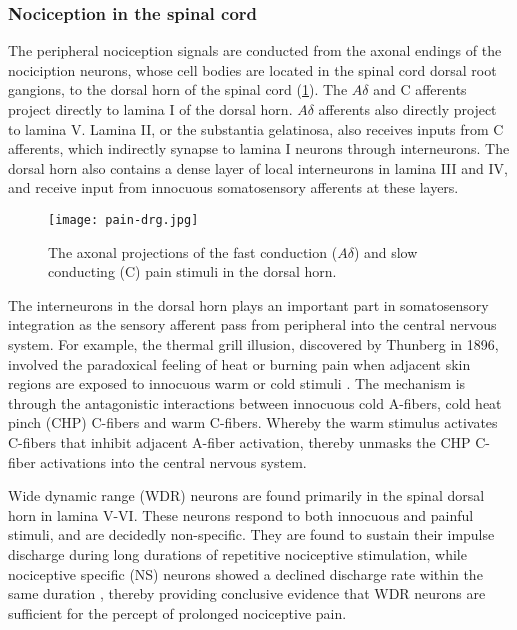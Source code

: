 \subsubsection{Nociception in the spinal cord}

The peripheral nociception signals are conducted from the axonal endings of the nociciption neurons, whose cell bodies are located in the spinal cord dorsal root gangions, to the dorsal horn of the spinal cord (\ref{fig:drg}). The $A\delta$ and C afferents project directly to lamina I of the dorsal horn. $A\delta$ afferents also directly project to lamina V. Lamina II, or the substantia gelatinosa, also receives inputs from C afferents, which indirectly synapse to lamina I neurons through interneurons. The dorsal horn also contains a dense layer of local interneurons in lamina III and IV, and receive input from innocuous somatosensory afferents at these layers. 

\begin{figure}[ht]
\texttt{[image: pain-drg.jpg]}
\centering
\caption{The axonal projections of the fast conduction ($ A\delta$) and slow conducting (C) pain stimuli in the dorsal horn.}
\label{fig:drg}
\end{figure}
 
The interneurons in the dorsal horn plays an important part in somatosensory integration as the sensory afferent pass from peripheral into the central nervous system. For example, the thermal grill illusion, discovered by Thunberg in 1896, involved the paradoxical feeling of heat or burning pain when adjacent skin regions are exposed to innocuous warm or cold stimuli \cite{Craig1994}. The mechanism is through the antagonistic interactions between innocuous cold A-fibers, cold heat pinch (CHP) C-fibers and warm C-fibers. Whereby the warm stimulus activates C-fibers that inhibit adjacent A-fiber activation, thereby unmasks the CHP C-fiber activations into the central nervous system.

Wide dynamic range (WDR) neurons are found primarily in the spinal dorsal horn in lamina V-VI. These neurons respond to both innocuous and painful stimuli, and are decidedly non-specific. They are found to sustain their impulse discharge during long durations of repetitive nociceptive stimulation, while nociceptive specific (NS) neurons showed a declined discharge rate within the same duration \cite{Coghill1993,Maixner1986}, thereby providing conclusive evidence that WDR neurons are sufficient for the percept of prolonged nociceptive pain. 

